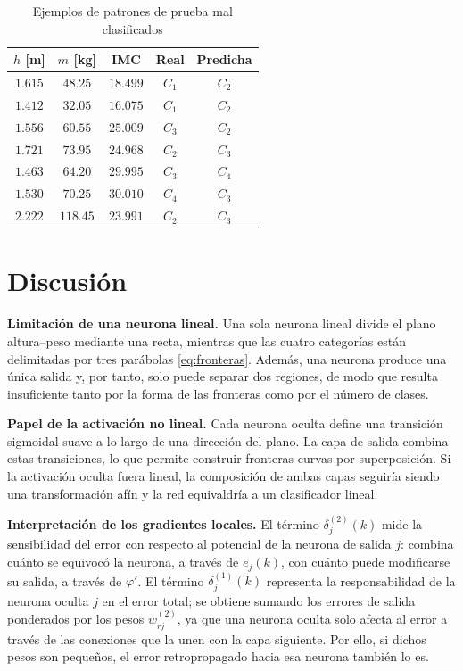 \documentclass[conference]{IEEEtran}
\begin{document}
\begin{table}[htbp]
\caption{Ejemplos de patrones de prueba mal clasificados}
\label{tab:ejemplos}
\begin{center}
\begin{tabular}{ccccc}
\toprule
$h$ [m] & $m$ [kg] & \textbf{IMC} & \textbf{Real} & \textbf{Predicha} \\
\midrule
$1.615$ & $48.25$  & $18.499$ & $C_1$ & $C_2$ \\
$1.412$ & $32.05$  & $16.075$ & $C_1$ & $C_2$ \\
$1.556$ & $60.55$  & $25.009$ & $C_3$ & $C_2$ \\
$1.721$ & $73.95$  & $24.968$ & $C_2$ & $C_3$ \\
$1.463$ & $64.20$  & $29.995$ & $C_3$ & $C_4$ \\
$1.530$ & $70.25$  & $30.010$ & $C_4$ & $C_3$ \\
$2.222$ & $118.45$ & $23.991$ & $C_2$ & $C_3$ \\
\bottomrule
\end{tabular}
\end{center}
\end{table}

\section{Discusión}

\textbf{Limitación de una neurona lineal.} Una sola neurona lineal divide el
plano altura--peso mediante una recta, mientras que las cuatro categorías
están delimitadas por tres parábolas \eqref{eq:fronteras}. Además, una
neurona produce una única salida y, por tanto, solo puede separar dos
regiones, de modo que resulta insuficiente tanto por la forma de las
fronteras como por el número de clases.

\textbf{Papel de la activación no lineal.} Cada neurona oculta define una
transición sigmoidal suave a lo largo de una dirección del plano. La capa de
salida combina estas transiciones, lo que permite construir fronteras
curvas por superposición. Si la activación oculta fuera lineal, la
composición de ambas capas seguiría siendo una transformación afín y la red
equivaldría a un clasificador lineal.

\textbf{Interpretación de los gradientes locales.} El término
$\delta_j^{(2)}(k)$ mide la sensibilidad del error con respecto al potencial
de la neurona de salida $j$: combina cuánto se equivocó la neurona, a
través de $e_j(k)$, con cuánto puede modificarse su salida, a través de
$\varphi'$. El término $\delta_j^{(1)}(k)$ representa la responsabilidad de
la neurona oculta $j$ en el error total; se obtiene sumando los errores de
salida ponderados por los pesos $w_{rj}^{(2)}$, ya que una neurona oculta
solo afecta al error a través de las conexiones que la unen con la capa
siguiente. Por ello, si dichos pesos son pequeños, el error retropropagado
hacia esa neurona también lo es.
\end{document}
